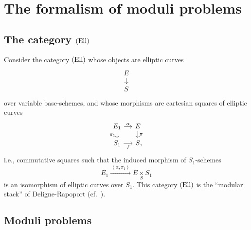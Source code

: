 \chapter{The formalism of moduli problems}
\label{ch:4}

\section{The category $(\mathrm{Ell})$}
\label{sec:4.1}

Consider the category $(\mathrm{Ell})$ whose objects are elliptic curves
\begin{equation}\label{eq:4.1.1}
\begin{tikzcd}[row sep=small, column sep=small]
E \arrow[d] \\
S
\end{tikzcd}
\end{equation}
over variable base-schemes, and whose morphisms are cartesian squares of elliptic curves
\begin{equation}\label{eq:4.1.2}
\begin{tikzcd}[row sep=small, column sep=small]
E_1 \arrow[r, "\alpha"] \arrow[d, "\pi_1"'] & E \arrow[d, "\pi"] \\
S_1 \arrow[r, "f"'] & S\rlap{,}
\end{tikzcd}
\end{equation}
i.e., commutative squares such that the induced morphism of $S_1$-schemes
\begin{equation}\label{eq:4.1.3}
E_1 \xrightarrow{\ (\alpha, \pi_1)\ } E \underset{S}{\times} S_1
\end{equation}
is an isomorphism of elliptic curves over $S_1$. This category $(\mathrm{Ell})$ is the ``modular stack'' of Deligne-Rapoport (cf.\ \cite{DeRa}).

\section{Moduli problems}
\label{sec:4.2}

